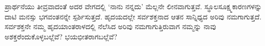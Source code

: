 ಪ್ರಾರ್ಥನೆಯು ತೀವ್ರವಾದಂತೆ ಅದರ ವೇಗದಲ್ಲಿ ‘ನಾನು ನನ್ನದು’ ಮೆಲ್ಲನೇ ಲೀನವಾಗುತ್ತವೆ. ಸ್ಥೂಲಸೂಕ್ಷ್ಮಕಾರಣಗಳನ್ನು ದಾಟಿ ಮನಸ್ಸು ಭಗವಂತನನ್ನೇ ಸ್ಪರ್ಶಿಸುತ್ತದೆ. ಹೃದಯದಲ್ಲೇ ಸರ್ವಶಕ್ತನಾದ ಆತನ ಸಾನ್ನಿಧ್ಯದ ಅರಿವು ನಮಗಾಗುತ್ತದೆ. ಸರ್ವಶಕ್ತನೇ ನಮ್ಮ ಹೃದಯಾಂತರಾಳದಲ್ಲಿ ನೆಲೆಸಿದ ಅರಿವು ನಮಗಾಗುತ್ತಿರುವಾಗ ನಮ್ಮನ್ನು ನಾವು ಅಶಕ್ತರೆಂದುಕೊಳ್ಳಬಲ್ಲೆವೆ? ಭಯ\-ಭೀತರಾಗಬಲ್ಲೆವೆ?

\chapterend


